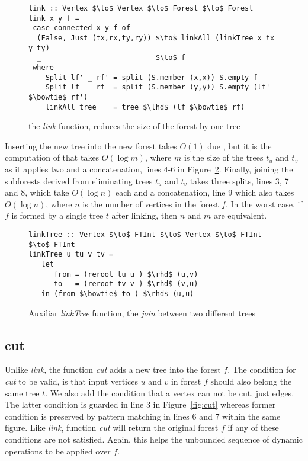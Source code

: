 \begin{figure}
\begin{lstlisting}[mathescape] 
link :: Vertex $\to$ Vertex $\to$ Forest $\to$ Forest 
link x y f = 
 case connected x y f of 
  (False, Just (tx,rx,ty,ry)) $\to$ linkAll (linkTree x tx y ty) 
  _                           $\to$ f 
 where 
    Split lf' _ rf' = split (S.member (x,x)) S.empty f 
    Split lf  _ rf  = split (S.member (y,y)) S.empty (lf' $\bowtie$ rf') 
    linkAll tree    = tree $\lhd$ (lf $\bowtie$ rf) 
\end{lstlisting} 
\caption{the \textit{link} function, reduces the size of the forest by one tree}
\label{fig:link}
\end{figure}

Inserting the new tree into the new forest takes $O(1)$ due , but it is the computation of  that takes $O(\log m)$, where $m$ is the size of the trees $t_u$ and $t_v$ as it applies two  and a concatenation, lines 4-6 in Figure~\ref{fig:linkTree}. Finally, joining the subforests derived from eliminating trees $t_u$ and $t_v$ takes three splits, lines 3, 7 and 8, which take $O(\log n)$ each and a concatenation, line 9 which also takes $O(\log n)$, where $n$ is the number of vertices in the forest $f$. In the worst case, if $f$ is formed by a single tree $t$ after linking, then $n$ and $m$ are equivalent.

\begin{figure}
\begin{lstlisting}[mathescape] 
linkTree :: Vertex $\to$ FTInt $\to$ Vertex $\to$ FTInt $\to$ FTInt 
linkTree u tu v tv =  
   let 
      from = (reroot tu u ) $\rhd$ (u,v)
      to   = (reroot tv v ) $\rhd$ (v,u) 
   in (from $\bowtie$ to ) $\rhd$ (u,u)  
\end{lstlisting} 
\caption{Auxiliar \textit{linkTree} function, the \textit{join} between two different trees}
\label{fig:linkTree}
\end{figure}



\subsection{cut}
Unlike \textit{link}, the function \textit{cut} adds a new tree into the forest $f$. The condition for \textit{cut} to be valid, is that input vertices $u$ and $v$ in forest $f$ should also belong the same tree $t$. We also add the condition that a vertex can not be cut, just edges. The latter condition is guarded in line 3 in Figure~\ref{fig:cut} whereas former condition is preserved by pattern matching in lines 6 and 7 within the same figure. Like \textit{link}, function \textit{cut} will return the original forest $f$ if any of these conditions are not satisfied. Again, this helps the unbounded sequence of dynamic operations to be applied over $f$.



